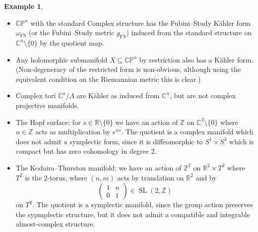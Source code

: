\documentclass{article}
\theoremstyle{definition}
\newtheorem*{example}{Example}
\DeclareMathOperator{\SL}{SL}
\newcommand{\FS}{\mathrm{FS}}
\newcommand{\CP}{\mathbb{CP}}
\newcommand{\Z}{\mathbb{Z}}
\newcommand{\R}{\mathbb{R}}
\newcommand{\C}{\mathbb{C}}
\begin{document}
\begin{example}
    ~
    \begin{itemize}
        \item $\CP^n$ with the standard Complex structure has the Fubini--Study
            K\"ahler form $\omega_\FS$ (or the Fubini--Study metric $g_\FS$)
            induced from the standard structure on $\C^n\setminus\{0\}$ by the
            quotient map.

        \item Any holomorphic submanifold $X\subseteq\CP^n$ by restriction also
            has a K\"ahler form. (Non-degeneracy of the restricted form is
            non-obvious, although using the equivalent condition on the
            Riemannian metric this is clear.)

        \item Complex tori $\C^n/\Lambda$ are K\"ahler as induced from $\C^n$,
            but are not complex projective manifolds.

        \item The Hopf surface: for $s\in\R\setminus\{0\}$ we have an action of
            $\Z$ on $\C^2\setminus\{0\}$ where $n\in\Z$ acts as multiplication
            by $e^{ns}$. The quotient is a complex manifold which does not admit
            a symplectic form, since it is diffeomorphic to $S^1\times S^3$
            which is compact but has zero cohomology in degree 2.

        \item The Kodaira--Thurston manifold: we have an action of $\Z^2$ on
            $\R^2\times T^2$ where $T^2$ is the 2-torus, where $(n,m)$ acts by
            translation on $\R^2$ and by
            \begin{equation*}
                \begin{pmatrix}
                    1 & n \\ 0 & 1
                \end{pmatrix} \in \SL(2,\Z)
            \end{equation*}
            on $T^2$. The quotient is a symplectic manifold, since the group
            action preserves the sypmplectic structure, but it does not admit a
            compatible and integrable almost-complex structure.


\end{itemize}
\end{example}
\end{document}
